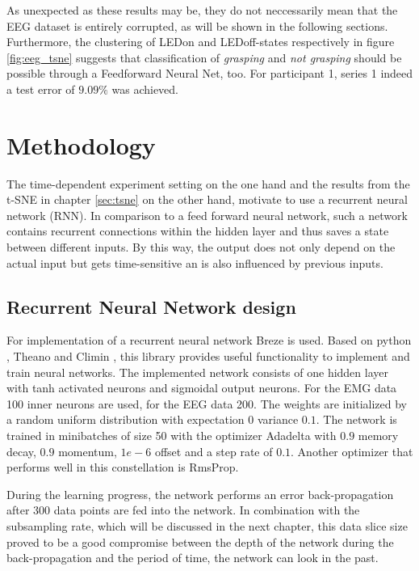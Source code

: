\documentclass{article} %
\begin{document}
As unexpected as these results may be, they do not neccessarily mean that the EEG dataset is entirely corrupted, as will be shown in the following sections. Furthermore, the clustering of LEDon and LEDoff-states respectively in figure \ref{fig:eeg_tsne} suggests that classification of \emph{grasping} and \emph{not grasping} should be possible through a Feedforward Neural Net, too. For participant 1, series 1 indeed a test error of $9.09\%$ was achieved.  

\section{Methodology}
The time-dependent experiment setting on the one hand and the results from the t-SNE in chapter \ref{sec:tsne} on the other hand, motivate to use a recurrent neural network (RNN). In comparison to a feed forward neural network, such a network contains recurrent connections within the hidden layer and thus saves a state between different inputs. By this way, the output does not only depend on the actual input but gets time-sensitive an is also influenced by previous inputs.

\subsection{Recurrent Neural Network design}
For implementation of a recurrent neural network Breze \cite{breze} is used. Based on python \cite{python}, Theano \cite{theano} and Climin \cite{climin}, this library provides useful functionality to implement and train neural networks. The implemented network consists of one hidden layer with tanh activated neurons and sigmoidal output neurons. For the EMG data 100 inner neurons are used, for the EEG data 200. The weights are initialized by a random uniform distribution with  expectation $0$ variance $0.1$. The network is trained in minibatches of size 50 with the optimizer Adadelta with $0.9$ memory decay, $0.9$ momentum, $1e-6$ offset and a step rate of $0.1$. Another optimizer that performs well in this constellation is RmsProp.

During the learning progress, the network performs an error back-propagation after $300$ data points are fed into the network. In combination with the subsampling rate, which will be discussed in the next chapter, this data slice size proved to be a good compromise between the depth of the network during the back-propagation and the period of time, the network can look in the past.
\end{document}
